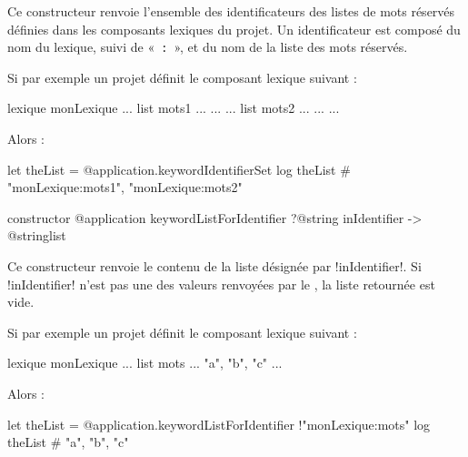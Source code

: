 Ce constructeur renvoie l'ensemble des identificateurs des listes de mots réservés définies dans les composants lexiques du projet. Un identificateur est composé du nom du lexique, suivi de «~\texttt{:}~», et du nom de la liste des mots réservés.


Si par exemple un projet définit le composant lexique suivant :

\begin{galgas3}
lexique monLexique {
  ...
  list mots1 ... { ... }
  ...
  list mots2 ... { ... }
  ...
}
\end{galgas3}

Alors :
\begin{galgas3}
let theList = @application.keywordIdentifierSet
log theList # "monLexique:mots1", "monLexique:mots2"
\end{galgas3}






\begin{galgas3box}
constructor @application keywordListForIdentifier
  ?@string inIdentifier
  -> @stringlist
\end{galgas3box}


Ce constructeur renvoie le contenu de la liste désignée par \ggst!inIdentifier!. Si \ggst!inIdentifier! n'est pas une des valeurs renvoyées par le , la liste retournée est vide.


Si par exemple un projet définit le composant lexique suivant :

\begin{galgas3}
lexique monLexique {
  ...
  list mots ... { "a", "b", "c" }
  ...
}
\end{galgas3}

Alors :
\begin{galgas3}
let theList = @application.keywordListForIdentifier {!"monLexique:mots"}
log theList # "a", "b", "c"
\end{galgas3}


